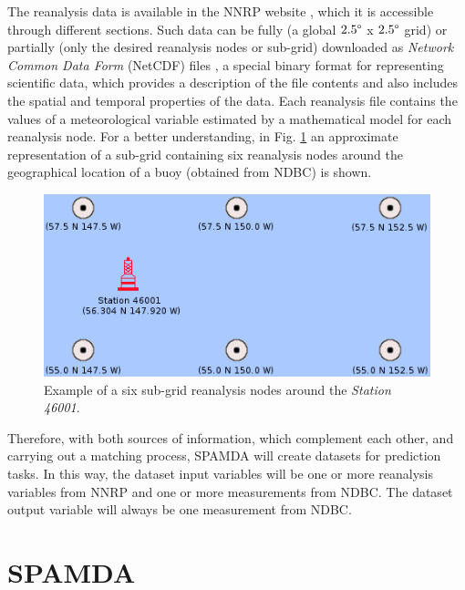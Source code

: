 \documentclass[review]{elsarticle}
\begin{document}
\begin{itemize}
			The reanalysis data is available in the NNRP website \cite{NNRP}, which it is accessible through different sections. Such data can be fully (a global $2.5\degree$ x $2.5\degree$ grid) or partially (only the desired reanalysis nodes or sub-grid) downloaded as \textit{Network Common Data Form} (NetCDF) files \cite{NetCDF}, a special binary format for representing scientific data, which provides a description of the file contents and also includes the spatial and temporal properties of the data. Each reanalysis file contains the values of a meteorological variable estimated by a mathematical model for each reanalysis node. For a better understanding, in Fig. \ref{fig:subGrid} an approximate representation of a sub-grid containing six reanalysis nodes around the geographical location of a buoy (obtained from NDBC) is shown.
			
			
			\begin{figure}[ht!]
				\centering
				\includegraphics[scale=0.52]{figures/FigureSubGrid.jpg}
				\caption{Example of a six sub-grid reanalysis nodes around the \textit{Station 46001}.}
				\label{fig:subGrid}
			\end{figure}
			
		\end{itemize}
		
		
		Therefore, with both sources of information, which complement each other, and carrying out a matching process, SPAMDA will create datasets for prediction tasks. In this way, the dataset input variables will be one or more reanalysis variables from NNRP and one or more measurements from NDBC. The dataset output variable will always be one measurement from NDBC.
		
	\section{SPAMDA}\label{sec:SPAMDA}
		
\end{document}
